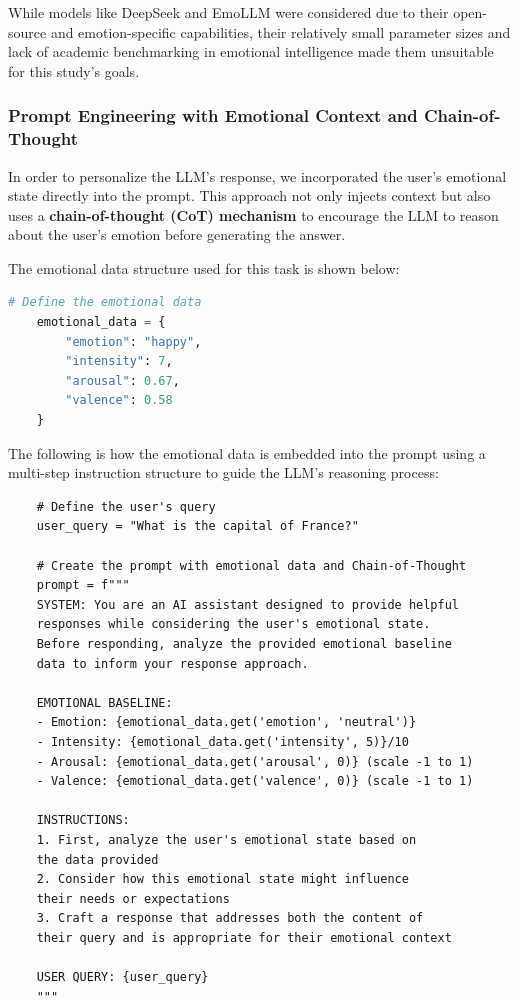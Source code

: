 \par While models like DeepSeek and EmoLLM were considered due to their open-source and emotion-specific capabilities, their relatively small parameter sizes and lack of academic benchmarking in emotional intelligence made them unsuitable for this study's goals.

\subsubsection*{Prompt Engineering with Emotional Context and Chain-of-Thought}

\par In order to personalize the LLM’s response, we incorporated the user's emotional state directly into the prompt. This approach not only injects context but also uses a \textbf{chain-of-thought (CoT) mechanism} to encourage the LLM to reason about the user's emotion before generating the answer.

\par The emotional data structure used for this task is shown below:

\begin{lstlisting}[language=Python, caption=Example of emotional data sent to LLM, basicstyle=\ttfamily\small, breaklines=true, xleftmargin=1.5em, xrightmargin=1.5em]
    # Define the emotional data
    emotional_data = {
        "emotion": "happy",
        "intensity": 7,
        "arousal": 0.67,
        "valence": 0.58
    }
\end{lstlisting}

\par The following is how the emotional data is embedded into the prompt using a multi-step instruction structure to guide the LLM’s reasoning process:


\begin{verbatim}
    # Define the user's query
    user_query = "What is the capital of France?"
    
    # Create the prompt with emotional data and Chain-of-Thought
    prompt = f"""
    SYSTEM: You are an AI assistant designed to provide helpful
    responses while considering the user's emotional state.
    Before responding, analyze the provided emotional baseline
    data to inform your response approach.
    
    EMOTIONAL BASELINE:
    - Emotion: {emotional_data.get('emotion', 'neutral')}
    - Intensity: {emotional_data.get('intensity', 5)}/10
    - Arousal: {emotional_data.get('arousal', 0)} (scale -1 to 1)
    - Valence: {emotional_data.get('valence', 0)} (scale -1 to 1)
    
    INSTRUCTIONS:
    1. First, analyze the user's emotional state based on 
    the data provided
    2. Consider how this emotional state might influence 
    their needs or expectations
    3. Craft a response that addresses both the content of 
    their query and is appropriate for their emotional context
    
    USER QUERY: {user_query}
    """
    \end{verbatim}


